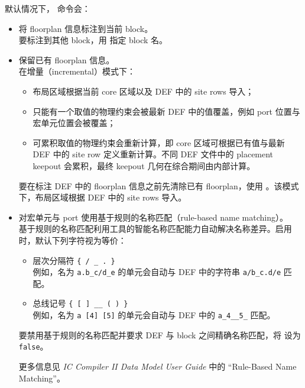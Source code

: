 默认情况下， 命令会：
\begin{itemize}
  \item 将 floorplan 信息标注到当前 block。\\
    要标注到其他 block，用  指定 block 名。
  \item 保留已有 floorplan 信息。\\
    在增量（incremental）模式下：
    \begin{itemize}
      \item 布局区域根据当前 core 区域以及 DEF 中的 site rows 导入；
      \item 只能有一个取值的物理约束会被最新 DEF 中的值覆盖，例如 port 位置与宏单元位置会被覆盖；
      \item 可累积取值的物理约束会重新计算，即 core 区域可根据已有值与最新 DEF 中的 site row 定义重新计算。不同 DEF 文件中的 placement keepout 会累积，最终 keepout 几何在综合期间由内部计算。
    \end{itemize}
    要在标注 DEF 中的 floorplan 信息之前先清除已有 floorplan，使用 。该模式下，布局区域根据 DEF 中的 site rows 导入。
  \item 对宏单元与 port 使用基于规则的名称匹配（rule-based name matching）。\\
    基于规则的名称匹配利用工具的智能名称匹配能力自动解决名称差异。启用时，默认下列字符视为等价：
    \begin{itemize}
      \item 层次分隔符 \texttt{\{ / \_ . \}}\\
        例如，名为 \texttt{a.b\_c/d\_e} 的单元会自动与 DEF 中的字符串 \texttt{a/b\_c.d/e} 匹配。
      \item 总线记号 \texttt{\{ [ ] \_\_ ( ) \}}\\
        例如，名为 \texttt{a [4] [5]} 的单元会自动与 DEF 中的 \texttt{a\_4\_\_5\_} 匹配。
    \end{itemize}
    要禁用基于规则的名称匹配并要求 DEF 与 block 之间精确名称匹配，将  设为 \texttt{false}。

\begin{seeAlsoBox}
更多信息见 \textit{IC Compiler II Data Model User Guide} 中的 ``Rule-Based Name Matching''。
\end{seeAlsoBox}


\end{itemize}
